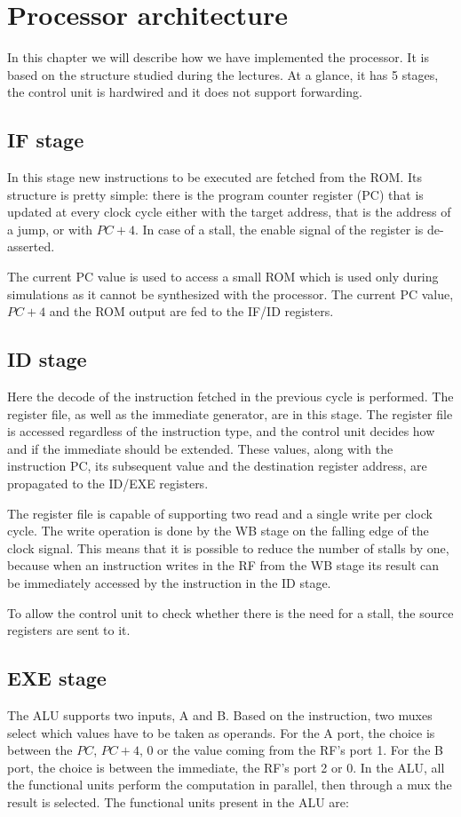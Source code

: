 \chapter{Processor architecture}

In this chapter we will describe how we have implemented the processor. It is based on the structure studied during the
lectures. At a glance, it has 5 stages, the control unit is hardwired and it does not support forwarding.

\section{IF stage}
In this stage new instructions to be executed are fetched from the ROM. Its structure is pretty simple:
there is the program counter register (PC) that is updated at every clock cycle either with the target address,
that is the address of a jump, or with $PC + 4$. In case of a stall, the enable signal of the register is
de-asserted.

The current PC value is used to access a small ROM which is used only during simulations as it cannot be synthesized with
the processor. The current PC value, $PC + 4$ and the ROM output are fed to the IF/ID registers.

\section{ID stage}
Here the decode of the instruction fetched in the previous cycle is performed. The register file, as well as the immediate generator,
are in this stage. The register file is accessed regardless of the instruction type, and the control unit decides how and if
the immediate should be extended. These values, along with the instruction PC, its subsequent value and the destination register address, are propagated to the
ID/EXE registers.

The register file is capable of supporting two read and a single write per clock cycle. The write operation is done by the
WB stage on the falling edge of the clock signal. This means that it is possible to reduce the number of stalls by one,
because when an instruction writes in the RF from the WB stage its result can be immediately accessed by the instruction in the ID stage.

To allow the control unit to check whether there is the need for a stall, the source registers are sent to it.

\section{EXE stage}
The ALU supports two inputs, A and B. Based on the instruction, two muxes select which values have to be taken as operands.
For the A port, the choice is between the $PC$, $PC+4$, $0$ or the value coming from the RF's port 1. For the B port,
the choice is between the immediate, the RF's port 2 or $0$. In the ALU, all the functional units perform the computation in parallel,
then through a mux the result is selected. The functional units present in the ALU are:

